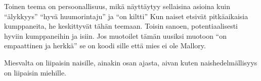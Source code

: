 Toinen teema on persoonallisuus, mikä näyttäytyy sellaisina asioina kuin ``älykkyys\vmq{,}'' ``hyvä huumorintaju\vmq{,}'' ja ``on kiltti'' Kun naiset etsivät pitkäaikaisia kumppaneita, he keskittyvät tähän teemaan. Toisin sanoen, potentiaalisesti hyviin kumppaneihin ja isiin. Jos muotoilet tämän uusiksi muotoon ``on empaattinen ja herkkä\vmq{,}'' se on koodi sille että mies ei ole Mallory.

Miesvalta on liipaisin naisille, ainakin osan ajasta, aivan kuten naishedelmällisyys on liipaisin miehille.









































